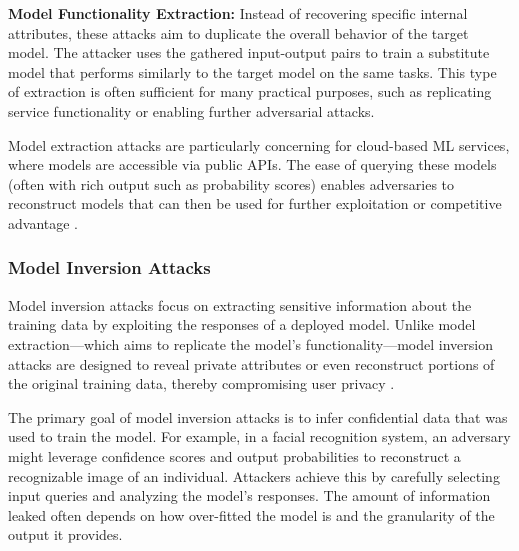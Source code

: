 \documentclass[conference]{IEEEtran}
\begin{document}
\textbf{Model Functionality Extraction:}
Instead of recovering specific internal attributes, these attacks aim to duplicate the overall behavior of the target model. The attacker uses the gathered input-output pairs to train a substitute model that performs similarly to the target model on the same tasks. This type of extraction is often sufficient for many practical purposes, such as replicating service functionality or enabling further adversarial attacks.


Model extraction attacks are particularly concerning for cloud-based ML services, where models are accessible via public APIs. The ease of querying these models (often with rich output such as probability scores) enables adversaries to reconstruct models that can then be used for further exploitation or competitive advantage \cite{gong2020model}.


\subsubsection{Model Inversion Attacks}

Model inversion attacks focus on extracting sensitive information about the training data by exploiting the responses of a deployed model. Unlike model extraction—which aims to replicate the model’s functionality—model inversion attacks are designed to reveal private attributes or even reconstruct portions of the original training data, thereby compromising user privacy \cite{dibbo2023sok}.

The primary goal of model inversion attacks is to infer confidential data that was used to train the model. For example, in a facial recognition system, an adversary might leverage confidence scores and output probabilities to reconstruct a recognizable image of an individual. Attackers achieve this by carefully selecting input queries and analyzing the model's responses. The amount of information leaked often depends on how over-fitted the model is and the granularity of the output it provides.
\end{document}
